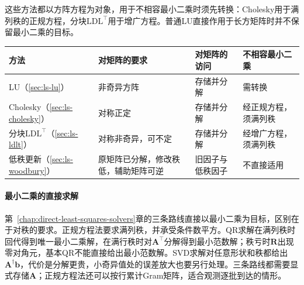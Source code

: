 这些方法都以方阵方程为对象，用于不相容最小二乘时须先转换：Cholesky用于满列秩的正规方程，分块$\mathrm{LDL}^\top$用于增广方程。普通LU直接作用于长方矩阵时并不保留最小二乘的目标。

\begin{BookInlineTable}
\small
\begin{tabular}{@{}>{\RaggedRight\arraybackslash}p{22mm}>{\RaggedRight\arraybackslash}p{}>{\RaggedRight\arraybackslash}p{}>{\RaggedRight\arraybackslash}p{}@{}}
\toprule
方法 & 对矩阵的要求 & 对矩阵的访问 & 不相容最小二乘\\
\midrule
LU（\ref{sec:ls-lu}） & 非奇异方阵 & 存储并分解 & 需转换\\
Cholesky（\ref{sec:ls-cholesky}） & 对称正定 & 存储并分解 & 经正规方程，须满列秩\\
分块$\mathrm{LDL}^\top$（\ref{sec:ls-ldlt}） & 对称非奇异，可不定 & 存储并分解 & 经增广方程，须满列秩\\
低秩更新（\ref{sec:ls-woodbury}） & 原矩阵已分解，修改秩低，辅助矩阵可逆 & 旧因子与低秩因子 & 不直接适用\\
\bottomrule
\end{tabular}
\caption{方阵直接分解的矩阵条件与适用方式。括号内为对应小节。}
\label{tab:ls-method-applicability}
\end{BookInlineTable}

\paragraph{最小二乘的直接求解}
第~\ref{chap:direct-least-squares-solvers}章的三条路线直接以最小二乘为目标，区别在于对秩的要求。正规方程法要求满列秩，并承受条件数平方。QR求解在满列秩时回代得到唯一最小二乘解，在满行秩时对$\bm A^\top$分解得到最小范数解；秩亏时$\bm R$出现零对角元，基本QR不能直接给出最小范数解。SVD求解对任意形状和秩都给出$\bm A^\dagger\bm b$，代价是分解更贵，小奇异值处的误差放大也要另行处理。三条路线都需要显式存储$\bm A$；正规方程法还可以按行累计Gram矩阵，适合观测逐批到达的情形。

